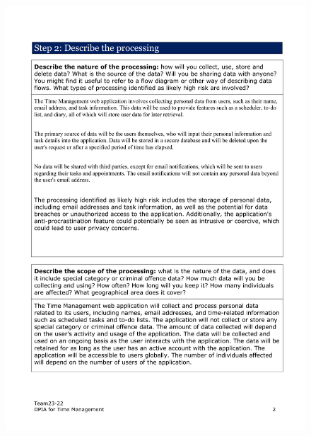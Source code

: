 \documentclass[a4paper]{article}
\begin{document}
\begin{figure}[H]
	\centering
	\includegraphics[width=1\textwidth]{./images/DPIA-Team23-22/DPIA-Team23-22_2.pdf}
	\label{Fig.DPIA_2}
\end{figure}
\end{document}
